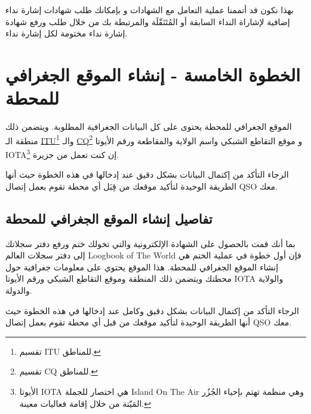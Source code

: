 \documentclass[a4paper,12pt]{article}
\begin{document}
بهذا نكون قد أتممنا عملية التعامل مع الشهادات و بإمكانك طلب شهادات إشارة
نداء إضافية لإشاراة النداء السابقة أو المُتَنَقّلَة والمرتبطة بك من خلال طلب
ورفع شهادة إشارة نداء مختومة لكل إشارة نداء.

\vspace{24pt}
\begin{center}
	\color{slategray2}
{\Huge\hrulefill\hspace{0.2cm} \floweroneright\floweroneleft \hspace{0.2cm} \hrulefill}
\end{center}
\newpage


\section{الخطوة الخامسة - إنشاء الموقع الجغرافي للمحطة}

الموقع الجغرافي للمحطة يحتوى على كل البيانات الجغرافية المطلوبة. ويتضمن
ذلك منطقة الـ {\href{http://www.mapability.com/ei8ic/maps/ituzone.php}{\textenglish{ITU}}\footnote{تقسيم \textenglish{ITU} للمناطق.}} والـ {\href{http://www.mapability.com/ei8ic/maps/cqzone.php}{\textenglish{CQ}}}\footnote{تقسيم CQ للمناطق.} و موقع التقاطع الشبكي واسم الولاية والمقاطعة
ورقم الأيوتا \textenglish{IOTA}\footnote{الأيوتا \textenglish{IOTA} هي اختصار للجملة \textenglish{Island On The Air} وهي منظمة تهتم بإحياء الجُزُر المَيّتة من خلال إقامة فعاليات معينة.} إن كنت تعمل من جزيرة.

الرجاء التأكد من إكتمال البيانات بشكل دقيق عند إدخالها في هذه الخطوة حيث
أنها الطريقة الوحيدة لتأكيد موقعك من قِبَل أي محطة تقوم بعمل إتصال \textenglish{QSO}
معك.

\vspace{18pt}
\begin{center}
	\color{slategray2}
{\Huge \decoone}
\end{center}

\subsection{تفاصيل إنشاء الموقع الجغرافي للمحطة}

بما أنك قمت بالحصول على الشهادة الإلكترونية والتي تخولك ختم ورفع دفتر
سجلاتك إلى دفتر سجلات العالم \textenglish{Loogbook of The World} فإن أول خطوة في عملية
الختم هي إنشاء الموقع الجغرافي للمحطة. هذا الموقع يحتوي على معلومات
جغرافية حول محطتك ويتضمن ذلك المنطقة وموقع التقاطع الشبكي ورقم الأيوتا
\textenglish{IOTA} والولاية والدولة.

الرجاء التأكد من إكتمال البيانات بشكل دقيق وكامل عند إدخالها في هذه
الخطوة حيث أنها الطريقة الوحيدة لتأكيد موقعك من قبل أي محطة تقوم بعمل
إتصال \textenglish{QSO} معك.
\end{document}
